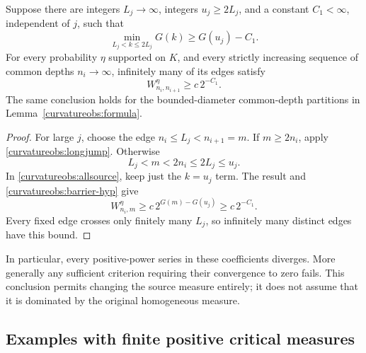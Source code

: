 \begin{lemma}\label{curvatureobs:barrier}
Suppose there are integers \(L_j\to\infty\), integers \(u_j\ge2L_j\),
and a constant \(C_1<\infty\), independent of \(j\), such that
\begin{equation}\label{curvatureobs:barrier-hyp}
 \min_{L_j<k\le2L_j}G(k)\ge G(u_j)-C_1.
\end{equation}
For every probability \(\eta\) supported on \(K\), and every strictly
increasing sequence of common depths \(n_i\to\infty\), infinitely many
of its edges satisfy
\[
 W^\eta_{n_i,n_{i+1}}\ge c\,2^{-C_1}.
\]
The same conclusion holds for the bounded-diameter common-depth
partitions in Lemma~\ref{curvatureobs:formula}.
\end{lemma}
\begin{proof}
For large \(j\), choose the edge \(n_i\le L_j<n_{i+1}=m\).
If \(m\ge2n_i\), apply \eqref{curvatureobs:longjump}.
Otherwise
\[
 L_j<m<2n_i\le2L_j\le u_j.
\]
In \eqref{curvatureobs:allsource}, keep just the \(k=u_j\) term.
The result and \eqref{curvatureobs:barrier-hyp} give
\[
 W^\eta_{n_i,m}
 \ge c\,2^{G(m)-G(u_j)}\ge c\,2^{-C_1}.
\]
Every fixed edge crosses only finitely many \(L_j\), so infinitely
many distinct edges have this bound.
\end{proof}

In particular, every positive-power series in these coefficients
diverges. More generally any sufficient criterion requiring their
convergence to zero fails. This conclusion permits changing the source
measure entirely; it does not assume that it is dominated by the
original homogeneous measure.

\subsection{Examples with finite positive critical measures}

